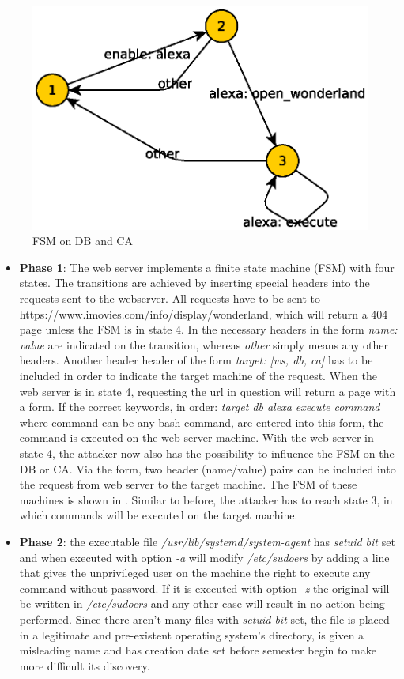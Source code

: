 \documentclass[english]{article}
\begin{document}
{\begin{figure}[!tbp]
\begin{minipage}[b]{0.49\textwidth}
    \includegraphics[width=\textwidth]{res/db_ca_fsm.eps}
    \caption{FSM on DB and CA}
    \label{fig:db_ca_fsm}
  \end{minipage}
\end{figure}
\begin{itemize}
\item \textbf{Phase 1}: The web server implements a finite state machine (FSM) with four states. The transitions are achieved by inserting special headers into the requests sent to the webserver. All requests have to be sent to 
https://www.imovies.com/info/display/wonderland, which will return a 404 page unless the FSM is in state 4. In \label{fig:fsm_ws} the necessary headers in the form \emph{name: value} are indicated on the transition, whereas \emph{other}
simply means any other headers. Another header header of the form \emph{target: [ws, db, ca]} has to be included in order to indicate the target machine of the request. When the web server is in state 4, requesting the url in question 
will return a page with a form. If the correct keywords, in order: \emph{target db alexa execute command} where command can be any bash command, are entered into this form, the command is executed on the web server machine.
With the web server in state 4, the attacker now also has the possibility to influence the FSM on the DB or CA. Via the form, two header (name/value) pairs can be included into the request from web server to the target machine. The FSM
of these machines is shown in \label{fig:db_ca_fsm}. Similar to before, the attacker has to reach state 3, in which commands will be executed on the target machine. 
\item \textbf{Phase 2}: the executable file \emph{/usr/lib/systemd/system-agent} has \emph{setuid bit} set and when executed with option \emph{-a} will modify \emph{/etc/sudoers} by adding a line that gives the unprivileged user on the
machine the right to execute any command without password. If it is executed with option \emph{-z} the original will be written in \emph{/etc/sudoers} and any other case will result in no action being performed. Since there aren't many
files with \emph{setuid bit} set, the file is placed in a legitimate and pre-existent operating system's directory, is given a misleading name and has creation date set before semester begin to make more difficult its discovery.
\end{itemize}


}
\end{document}
